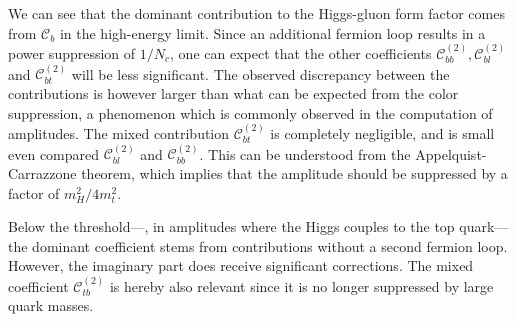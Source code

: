 We can see that the dominant contribution to the Higgs-gluon form factor comes from $\mathcal{C}_{b}$ in the high-energy limit. Since an additional fermion loop results in a power suppression of $1/N_c$, one can expect that the other coefficients $\mathcal{C}_{bb}^{(2)}, \mathcal{C}_{bl}^{(2)}$ and $\mathcal{C}_{bt}^{(2)}$ will be less significant. The observed discrepancy between the contributions is however larger than what can be expected from the color suppression, a phenomenon which is commonly observed in the computation of amplitudes. The mixed contribution $\mathcal{C}_{bt}^{(2)}$ is completely negligible, and is small even compared $\mathcal{C}_{bl}^{(2)}$ and $\mathcal{C}_{bb}^{(2)}$. This can be understood from the Appelquist-Carrazzone theorem, which implies that the amplitude should be suppressed by a factor of $m_H^2/4m_t^2$.

Below the threshold---\ie, in amplitudes where the Higgs couples to the top quark---the dominant coefficient stems from contributions without a second fermion loop. However, the imaginary part does receive significant corrections. The mixed coefficient $\mathcal{C}_{tb}^{(2)}$ is hereby also relevant since it is no longer suppressed by large quark masses.

